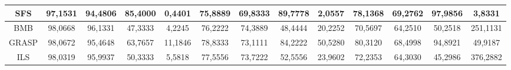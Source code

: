 \documentclass[12pt]{article}
\begin{document}
\begin{table}[H]
{\begin{tabular}{|c|cccc|cccc|cccc|}
SFS   & \multicolumn{1}{c|}{97,1531}                                                  & \multicolumn{1}{c|}{94,4806}                                                 & \multicolumn{1}{c|}{85,4000} & 0,4401  & \multicolumn{1}{c|}{75,8889}                                                  & \multicolumn{1}{c|}{69,8333}                                                 & \multicolumn{1}{c|}{89,7778} & 2,0557  & \multicolumn{1}{c|}{78,1368}                                                  & \multicolumn{1}{c|}{69,2762}                                                 & \multicolumn{1}{c|}{97,9856} & 3,8331   \\ \hline
BMB   & \multicolumn{1}{c|}{98,0668}                                                  & \multicolumn{1}{c|}{96,1331}                                                 & \multicolumn{1}{c|}{47,3333} & 4,2245  & \multicolumn{1}{c|}{76,2222}                                                  & \multicolumn{1}{c|}{74,3889}                                                 & \multicolumn{1}{c|}{48,4444} & 20,2252 & \multicolumn{1}{c|}{70,5697}                                                  & \multicolumn{1}{c|}{64,2510}                                                 & \multicolumn{1}{c|}{50,2518} & 251,1131 \\ \hline
GRASP & \multicolumn{1}{c|}{98,0672}                                                  & \multicolumn{1}{c|}{95,4648}                                                 & \multicolumn{1}{c|}{63,7657} & 11,1846 & \multicolumn{1}{c|}{78,8333}                                                  & \multicolumn{1}{c|}{73,1111}                                                 & \multicolumn{1}{c|}{84,2222} & 50,5280 & \multicolumn{1}{c|}{80,3120}                                                  & \multicolumn{1}{c|}{68,4998}                                                 & \multicolumn{1}{c|}{94,8921} & 49,9187  \\ \hline
ILS   & \multicolumn{1}{c|}{98,0319}                                                  & \multicolumn{1}{c|}{95,9937}                                                 & \multicolumn{1}{c|}{50,3333} & 5,5818  & \multicolumn{1}{c|}{77,5556}                                                  & \multicolumn{1}{c|}{73,7222}                                                 & \multicolumn{1}{c|}{52,5556} & 23,9602 & \multicolumn{1}{c|}{72,2353}                                                  & \multicolumn{1}{c|}{64,3030}                                                 & \multicolumn{1}{c|}{45,2986} & 376,2882 \\ \hline
\end{tabular}}
\end{table}
\end{document}
